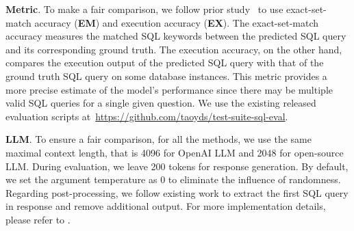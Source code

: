 \textbf{Metric}. 
To make a fair comparison, we follow prior study~\cite{DBLP:conf/emnlp/ZhongYK20} to use exact-set-match accuracy ({\bf{EM}}) and execution accuracy ({\bf{EX}}). 
The exact-set-match accuracy measures the matched SQL keywords between the predicted SQL query and its corresponding ground truth. 
The execution accuracy, on the other hand, compares the execution output of the predicted SQL query with that of the ground truth SQL query on some database instances. 
This metric provides a more precise estimate of the model's performance since there may be multiple valid SQL queries for a single given question.
We use the existing released evaluation scripts at~\href{https://github.com/taoyds/test-suite-sql-eval}{https://github.com/taoyds/test-suite-sql-eval}. 

\textbf{LLM}.
To ensure a fair comparison, for all the methods, we use the same maximal context length, that is 4096 for OpenAI LLM and 2048 for open-source LLM. 
During evaluation, we leave 200 tokens for response generation. 
By default, we set the argument temperature as 0 to eliminate the influence of randomness. 
Regarding post-processing, we follow existing work to extract the first SQL query in response and remove additional output. 
For more implementation details, please refer to .
